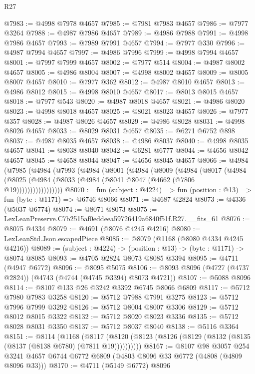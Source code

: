 \begin{lexlean}{R27}
\begin{coremodule}
@7983 := @4998 @7978 @4657
@7985 := @7981 @7983 @4657
@7986 := @7977 @3264
@7988 := @4987 @7986 @4657
@7989 := @4986 @7988
@7991 := @4998 @7986 @4657
@7993 := @7989 @7991 @4657
@7994 := @7977 @330
@7996 := @4987 @7994 @4657
@7997 := @4986 @7996
@7999 := @4998 @7994 @4657
@8001 := @7997 @7999 @4657
@8002 := @7977 @514
@8004 := @4987 @8002 @4657
@8005 := @4986 @8004
@8007 := @4998 @8002 @4657
@8009 := @8005 @8007 @4657
@8010 := @7977 @362
@8012 := @4987 @8010 @4657
@8013 := @4986 @8012
@8015 := @4998 @8010 @4657
@8017 := @8013 @8015 @4657
@8018 := @7977 @543
@8020 := @4987 @8018 @4657
@8021 := @4986 @8020
@8023 := @4998 @8018 @4657
@8025 := @8021 @8023 @4657
@8026 := @7977 @357
@8028 := @4987 @8026 @4657
@8029 := @4986 @8028
@8031 := @4998 @8026 @4657
@8033 := @8029 @8031 @4657
@8035 := @6271 @6752 @898
@8037 := @4987 @8035 @4657
@8038 := @4986 @8037
@8040 := @4998 @8035 @4657
@8041 := @8038 @8040
@8042 := @6281 @6777
@8044 := @4656 @8042 @4657
@8045 := @4658 @8044
@8047 := @4656 @8045 @4657
@8066 := @4984
    (@7985
      (@4984
        (@7993
          (@4984
            (@8001
              (@4984
                (@8009
                  (@4984
                    (@8017
                      (@4984
                        (@8025 (@4984 (@8033 (@4984 (@8041 @8047 (@4662 (@7806 @19)))))))))))))))))
@8070 := fun (subject : @4224) => fun (position : @13) => fun (byte : @1171) => @6746 @8066
@8071 := @4687 @2824
@8073 := @4336 (@5037 @6774)
@8074 := @8071 @8073
@8075 := LexLeanPreserve.C7b2515af0eddeea59726419a6840f51f.R27.__fits_61
@8076 := @8075 @4334
@8079 := @4691 (@8076 @4245 @4216)
@8080 := LexLeanStd.Json.escapedPiece
@8085 := @8079 (@1168 (@8080 @4334 @4245 @4216))
@8089 := (subject : @4224) -> (position : @13) -> (byte : @1171) -> @8074 @8085
@8093 := @4705 @2824 @8073 @8085 @3394
@8095 := @4711 (@4947 @6772)
@8096 := @8095 @5075
@8106 := @8093 @8096 (@4727 (@4737 @2824)) (@4743 (@4744 (@4745 @3394) @8073 @4721))
@8107 := @5088 @8096
@8114 := @8107 @133 @26 @3242 @3392 @6745 @8066 @6809
@8117 := @5712 @7980 @7983 @3258
@8120 := @5712 @7988 @7991 @3275
@8123 := @5712 @7996 @7999 @3292
@8126 := @5712 @8004 @8007 @3306
@8129 := @5712 @8012 @8015 @3322
@8132 := @5712 @8020 @8023 @3336
@8135 := @5712 @8028 @8031 @3350
@8137 := @5712 @8037 @8040
@8138 := @5116 @3364
@8151 := @8114
    (@1168
      (@8117 (@8120 (@8123 (@8126 (@8129 (@8132 (@8135 (@8137 (@8138 @6780) (@7811 @19))))))))))
@8167 := @8107
    @98
    @3057
    @254
    @3241
    @4657
    @6744
    @6772
    @6809
    (@4803 @8096 @33 @6772 (@4808 (@4809 @8096 @33)))
@8170 := @4711 (@5149 @6772) @8096

\end{coremodule}
\end{lexlean}
